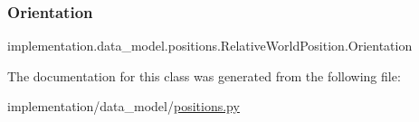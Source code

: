 \subsubsection{\texorpdfstring{Orientation}{Orientation}}
{\footnotesize\ttfamily implementation.\+data\+\_\+model.\+positions.\+Relative\+World\+Position.\+Orientation\hspace{0.3cm}{\ttfamily [static]}}



The documentation for this class was generated from the following file\+:\begin{DoxyCompactItemize}
\item 
implementation/data\+\_\+model/\hyperlink{positions_8py}{positions.\+py}\end{DoxyCompactItemize}

